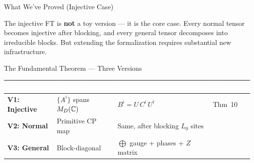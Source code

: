\documentclass[aspectratio=169,10pt]{beamer}
\begin{document}
\begin{frame}{What We've Proved (Injective Case)}
    \vspace{0.6em}
    \begin{center}
    \colorbox{cardbg}{\parbox{0.92\textwidth}{\centering\small
    \textcolor{dimwhite}{The injective FT is \textbf{not} a toy version --- it is the
    \textcolor{leangreen}{core case}. Every normal tensor becomes injective after blocking,
    and every general tensor decomposes into irreducible blocks.
    But extending the formalization requires substantial new infrastructure.}}}
    \end{center}
\end{frame}

\begin{frame}{The Fundamental Theorem --- Three Versions}
    \vspace{-0.3em}

    \renewcommand{\arraystretch}{1.3}
    {\small
    \begin{center}
    \begin{tabular}{>{\bfseries\color{white}}l
                    >{\color{dimwhite}\small}p{3.2cm}
                    >{\color{dimwhite}\small}p{4.2cm}
                    >{\color{dimwhite}\footnotesize}l}
        \toprule
        \rowcolor{cardbg}
        \textcolor{white}{Version} & \textcolor{white}{Tensor class} & \textcolor{white}{Result} & \textcolor{white}{Reference} \\
        \midrule
        \rowcolor{cardbg}
        \textcolor{amber}{V1: Injective} &
            $\{A^i\}$ spans $M_D(\mathbb{C})$ &
            $B^i = U\, C^i\, U^\dagger$ &
            \cite{Perez-Garcia2007Matrix} Thm~10 \\
        \rowcolor{cardbg}
        \textcolor{leangreen}{V2: Normal} &
            Primitive CP map &
            Same, after blocking $L_0$ sites &
            \cite{Cirac2017Annals} \\
        \rowcolor{cardbg}
        \textcolor{leanblue}{V3: General} &
            Block-diagonal &
            $\bigoplus$ gauge + phases + $Z$ matrix &
            \cite{Cirac2017Irreducible} \\
        \bottomrule
    \end{tabular}
    \end{center}
    }


\end{frame}
\end{document}
